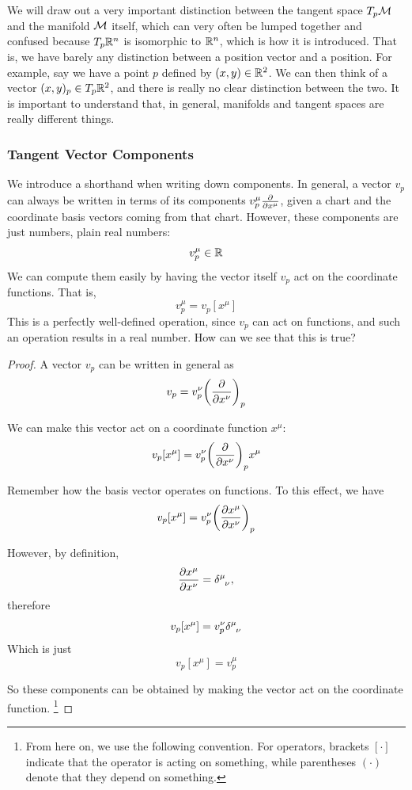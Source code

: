 	We will draw out a very important distinction between the tangent space
	$T_p \mathcal{M}$ and the manifold $\mathcal{M}$ itself, which can very often be lumped
	together and confused because $T_p\mathbb{R}^n$ is isomorphic to $\mathbb{R}^n$, which
	is how it is introduced. That is, we have barely any distinction
	between a position vector and a position. For example, say we have a point
	$p$ defined by $(x,y)\in\mathbb{R}^2$. We can then think of a vector
	$(x,y)_p\in T_p\mathbb{R}^2$, and there is really no clear distinction between the two.
	It is important to understand that, in general, manifolds and tangent spaces
	are really different things.

	\subsubsection{Tangent Vector Components}

		We introduce a shorthand when writing down components. In general, a vector
		$v_p$ can always be written in terms of its components
		$v_p^\mu \pdv{}{x^\mu}$, given a chart and the coordinate basis vectors
		coming from that chart. However, these components are just numbers,
		plain real numbers:
		\[
			v_p^\mu\in\mathbb{R}
		\]
		We can compute them easily by having the vector itself $v_p$ act
		on the coordinate functions. That is,
		\begin{equation}
			\label{eq:vectoract}
			v_p^\mu = v_p[x^\mu]
		\end{equation}
		This is a perfectly well-defined operation, since $v_p$ can act on functions,
		and such an operation results in a real number. How can we see that this is true?
		\begin{proof}
			A vector $v_p$ can be written in general as
			\[
				v_p = v_p^\nu \pqty{\pdv{}{x^\nu}}_p
			\]

			We can make this vector act on a coordinate function $x^\mu$:
			\[
				v_p[x^\mu]
				= v_p^\nu \qty(\pdv{}{x^\nu})_p x^\mu
			\]

			Remember how the basis vector operates on functions. To this effect,
			we have
			\[
				v_p[x^\mu]
				= v_p^\nu \qty(\pdv{x^\mu}{x^\nu})_p
			\]

			However, by definition,
			\[
				\pdv{x^\mu}{x^\nu}
				= \tensor{\delta}{^\mu_\nu},
			\]
			therefore
			\[
				v_p[x^\mu]
				= v_p^\nu \tensor{\delta}{^\mu_\nu}
			\]
			Which is just
			\[
				v_p[x^\mu] = v_p^\mu
			\]

			So these components can be obtained by making the vector
			act on the coordinate function.
			\footnote{
				From here on, we use the following convention. For operators, brackets
				$[\cdot]$ indicate that the operator is acting on something, while
				parentheses $(\cdot)$ denote that they depend on something.
			}
		\end{proof}

